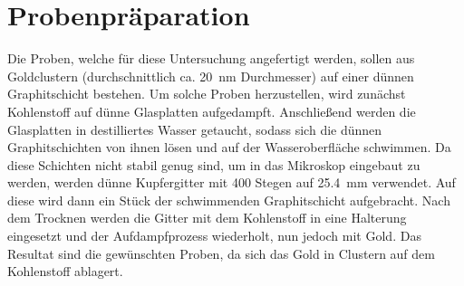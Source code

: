\clearpage
\section{Probenpräparation}
\label{sec:prep}

	Die Proben, welche für diese Untersuchung angefertigt werden, sollen aus Goldclustern (durchschnittlich ca. \SI{20}{\nano\meter} Durchmesser) auf einer dünnen Graphitschicht bestehen.
	Um solche Proben herzustellen, wird zunächst Kohlenstoff auf dünne Glasplatten aufgedampft.
	Anschließend werden die Glasplatten in destilliertes Wasser getaucht, sodass sich die dünnen Graphitschichten von ihnen lösen und auf der Wasseroberfläche schwimmen.
	Da diese Schichten nicht stabil genug sind, um in das Mikroskop eingebaut zu werden, werden dünne Kupfergitter mit 400 Stegen auf \SI{25,4}{\milli\meter} verwendet. %
	Auf diese wird dann ein Stück der schwimmenden Graphitschicht aufgebracht.
	Nach dem Trocknen werden die Gitter mit dem Kohlenstoff in eine Halterung eingesetzt und der Aufdampfprozess wiederholt, nun jedoch mit Gold.
	Das Resultat sind die gewünschten Proben, da sich das Gold in Clustern auf dem Kohlenstoff ablagert.

